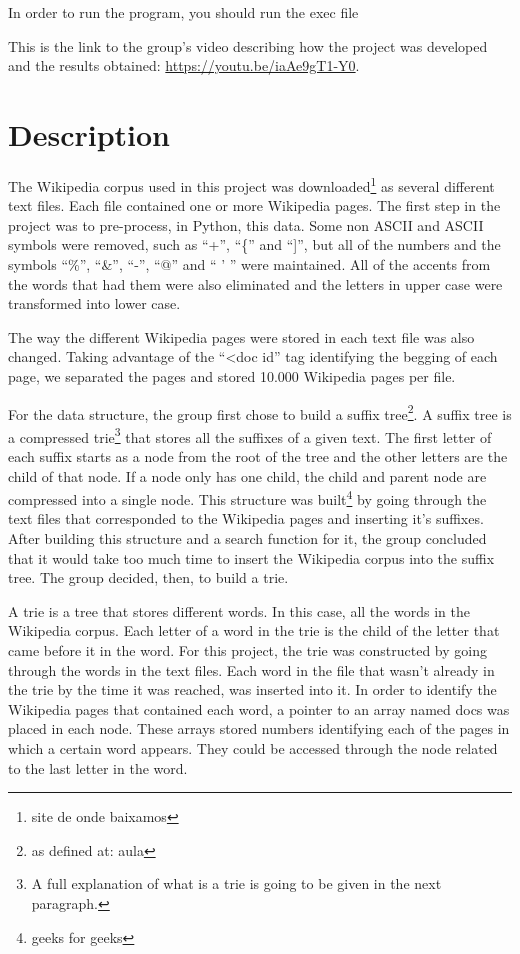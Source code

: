 \documentclass{article}
\begin{document}
In order to run the program, you should run the exec file 

This is the link to the group's video describing how the project was developed and the results obtained: \url{https://youtu.be/iaAe9gT1-Y0}. 

\section*{Description}
The Wikipedia corpus used in this project was downloaded\footnote{site de onde baixamos}  as several different text files. Each file contained one or more Wikipedia pages. The first step in the project was to pre-process, in Python, this data. Some non ASCII and ASCII symbols were removed, such as ``+'', ``\{'' and ``]'', but all of the numbers and the symbols ``\%'', ``\&'', ``-'', ``@'' and `` ' '' were maintained. All of the accents from the words that had them were also eliminated and the letters in upper case were transformed into lower case. 

The way the different Wikipedia pages were stored in each text file was also changed. Taking advantage of the ``<doc id'' tag identifying the begging of each page, we separated the pages and stored 10.000 Wikipedia pages per file. 

For the data structure, the group first chose to build a suffix tree\footnote{as defined at: aula}. A suffix tree is a compressed trie\footnote{A full explanation of what is a trie is going to be given in the next paragraph.} that stores all the suffixes of a given text. The first letter of each suffix starts as a node from the root of the tree and the other letters are the child of that node. If a node only has one child, the child and parent node are compressed into a single node. This structure was built\footnote{geeks for geeks} by going through the text files that corresponded to the Wikipedia pages and inserting it's suffixes. After building this structure and a search function for it, the group concluded that it would take too much time to insert the Wikipedia corpus into the suffix tree. The group decided, then, to build a trie. 

A trie is a tree that stores different words. In this case, all the words in the Wikipedia corpus. Each letter of a word in the trie is the child of the letter that came before it in the word. 
For this project, the trie was constructed by going through the words in the text files. Each word in the file that wasn't already in the trie by the time it was reached, was inserted into it. In order to identify the Wikipedia pages that contained each word, a pointer to an array named docs was placed in each node. These arrays stored numbers identifying each of the pages in which a certain word appears. They could be accessed through the node related to the last letter in the word. 
\end{document}
